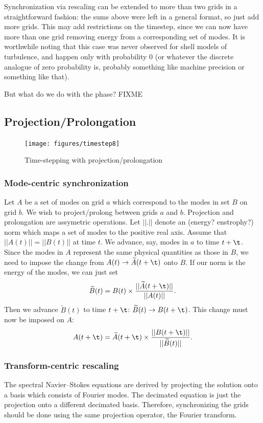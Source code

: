 \documentclass[10pt,showpacs,showkeys,%
amsfonts,amsmath,onecolumn,
floatfix,aps,superscriptaddress]{revtex4}
\begin{document}
Synchronization via rescaling can be extended to more than two grids in
a straightforward fashion: the sums above were left in a general format,
so just add more grids. This may add restrictions on the timestep, since
we can now have more than one grid removing energy from a corresponding 
set of modes. It is worthwhile noting that this case was never observed 
for shell models of turbulence, and happen only with probability 0 (or
whatever the discrete analogue of zero probability is, probably something
like machine precision or something like that).

But what do we do with the phase? FIXME

\subsection{Projection/Prolongation}
\begin{figure}[htbp]
  \begin{center}
    \texttt{[image: figures/timestep8]}
    \caption{Time-stepping with projection/prolongation}
    \label{timestep8}
  \end{center}
\end{figure}
\subsubsection{Mode-centric synchronization}
Let $A$ be a set of modes on grid $a$ which correspond to the modes in
set $B$ on grid $b$.  We wish to project/prolong between grids $a$ and
$b$.  Projection and prolongation are assymetric operations.  Let
$||.||$ denote an (energy? enstrophy?) norm which maps a set of modes
to the positive real axis. Assume that $||A(t)||=||B(t)||$ at time
$t$. We advance, say, modes in $a$ to time $t+\t$. Since the modes in
$A$ represent the same physical quantities as those in $B$, we need to
impose the change from $A(t) \rightarrow \widetilde{A}(t+\t)$ onto $B$. If
our norm is the energy of the modes, we can just set
\begin{dmath}
  \widetilde{B}(t) = B(t) \times \frac{||\widetilde{A}(t+\t)||}{||A(t)||}.
\end{dmath}
Then we advance $\widetilde{B}(t)$ to time $t+\t$:
$\widetilde{B}(t)\rightarrow B(t+\t)$.  This change must now be imposed on $A$:
\begin{dmath}
  A(t+\t) = \widetilde{A}(t+\t)\times \frac{||B(t+\t)||}{||\widetilde{B}(t)||}.
\end{dmath}

\subsubsection{Transform-centric rescaling}
The spectral Navier--Stokes equations are derived by projecting the
solution onto a basis which consists of Fourier modes.  The decimated
equation is just the projection onto a different decimated
basis. Therefore, synchronizing the grids should be done using the
same projection operator, the Fourier transform.
\end{document}
